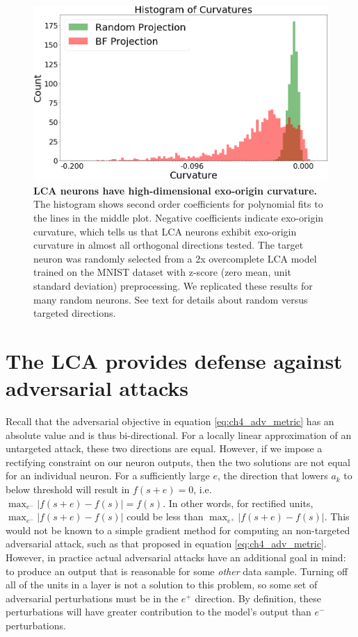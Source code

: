 \begin{figure}
    \begin{center}
    \centerline{\includegraphics[width=\textwidth]{figures/iso_contour_lca_hists.png}}
    \end{center}
    \caption{\textbf{LCA neurons have high-dimensional exo-origin curvature.} The histogram shows second order coefficients for polynomial fits to the lines in the middle plot. Negative coefficients indicate exo-origin curvature, which tells us that LCA neurons exhibit exo-origin curvature in almost all orthogonal directions tested. The target neuron was randomly selected from a 2x overcomplete LCA model trained on the MNIST dataset with z-score (zero mean, unit standard deviation) preprocessing. We replicated these results for many random neurons. See text for details about random versus targeted directions.}
    \label{fig:ch4_iso_contour_lca_hists}
\end{figure}


\section{The LCA provides defense against adversarial attacks}
Recall that the adversarial objective in equation \eqref{eq:ch4_adv_metric} has an absolute value and is thus bi-directional. For a locally linear approximation of an untargeted attack, these two directions are equal. However, if we impose a rectifying constraint on our neuron outputs, then the two solutions are not equal for an individual neuron. For a sufficiently large $e$, the direction that lowers $a_{k}$ to below threshold will result in $f(s+e)=0$, i.e. $\max_{e^{-}}|f(s+e)-f(s)| = f(s)$. In other words, for rectified units, $\max_{e^{-}}|f(s+e)-f(s)|$ could be less than $\max_{e^{+}}|f(s+e)-f(s)|$. This would not be known to a simple gradient method for computing an non-targeted adversarial attack, such as that proposed in equation \eqref{eq:ch4_adv_metric}. However, in practice actual adversarial attacks have an additional goal in mind: to produce an output that is reasonable for some \emph{other} data sample. Turning off all of the units in a layer is not a solution to this problem, so some set of adversarial perturbations must be in the $e^{+}$ direction. By definition, these perturbations will have greater contribution to the model's output than $e^{-}$ perturbations.

